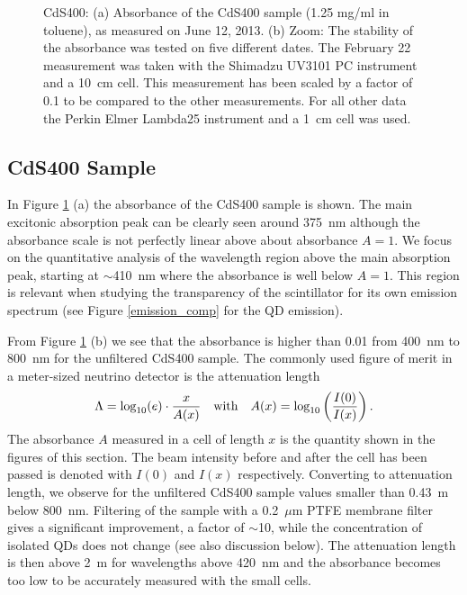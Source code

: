 \documentclass[cits]{JINST}
\begin{document}
\begin{figure}[tb]
\begin{center}
\caption[]{CdS400: (a) Absorbance of the CdS400 sample (1.25 mg/ml in toluene), as measured on June 12, 2013. (b) Zoom: The stability of the absorbance was tested on five different dates. The February 22 measurement was taken with the Shimadzu UV3101 PC instrument and a 10~cm cell. This measurement has been scaled by a factor of 0.1 to be compared to the other measurements. For all other data the Perkin Elmer Lambda25 instrument and a 1~cm cell was used. \label{cds400_stability}}
\end{center}
\end{figure}

\subsection{CdS400 Sample}
In Figure \ref{cds400_stability} (a) the absorbance of the CdS400 sample is shown. The main excitonic absorption peak can be clearly seen around 375~nm although the absorbance scale is not perfectly linear above about absorbance $A=1$. We focus on the quantitative analysis of the wavelength region above the main absorption peak, starting at $\sim$410~nm where the absorbance is well below $A=1$. This region is relevant when studying the transparency of the scintillator for its own emission spectrum (see Figure \ref{emission_comp} for the QD emission). 

From Figure \ref{cds400_stability} (b) we see that the absorbance is higher than 0.01 from 400~nm to 800~nm for the unfiltered CdS400 sample. The commonly used figure of merit in a meter-sized neutrino detector is the attenuation length
\begin{equation}
\Lambda = \textnormal{log}_{10}(e) \cdot \frac{x}{A(x)} \quad \textnormal{with} \quad A(x) = \textnormal{log}_{10} \left( \frac{I(0)}{I(x)} \right).   
\end{equation}  
The absorbance $A$ measured in a cell of length $x$ is the quantity shown in the figures of this section. The beam intensity before and after the cell has been passed is denoted with $I(0)$ and $I(x)$ respectively. Converting to attenuation length, we observe for the unfiltered CdS400 sample values smaller than 0.43~m below 800~nm. Filtering of the sample with a 0.2~$\mu$m PTFE membrane filter gives a significant improvement, a factor of $\sim$10, while the concentration of isolated QDs does not change (see also discussion below). The attenuation length is then above 2~m for wavelengths above 420~nm and the absorbance becomes too low to be accurately measured with the small cells. 
 
\end{document}
